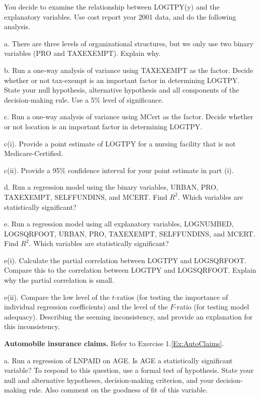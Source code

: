 \begin{exercises}
You decide to examine the relationship between LOGTPY(y) and the
explanatory variables. Use cost report year 2001 data, and do the
following analysis.

a. There are three levels of organizational structures, but we only
use two binary variables (PRO and TAXEXEMPT). Explain why.

b. Run a one-way analysis of variance using TAXEXEMPT as the factor.
Decide whether or not tax-exempt is an important factor in
determining LOGTPY. State your null hypothesis, alternative
hypothesis and all components of the decision-making rule. Use a 5\%
level of significance.

c. Run a one-way analysis of variance using MCert as the factor.
Decide whether or not location is an important factor in determining
LOGTPY.

c(i). Provide a point estimate of LOGTPY for a nursing facility that
is not Medicare-Certified.

c(ii).  Provide a 95\% confidence interval for your point estimate
in part (i).

d. Run a regression model using the binary variables, URBAN, PRO,
TAXEXEMPT, SELFFUNDINS, and MCERT. Find $R^{2}$. Which variables are
statistically significant?

e. Run a regression model using all explanatory variables,
LOGNUMBED, LOGSQRFOOT, URBAN, PRO, TAXEXEMPT, SELFFUNDINS, and
MCERT. Find $R^{2}$. Which variables are statistically significant?

e(i). Calculate the partial correlation between LOGTPY and
LOGSQRFOOT. Compare this to the correlation between LOGTPY and
LOGSQRFOOT. Explain why the partial correlation is small.

e(ii). Compare the low level of the $t$-ratios (for testing the
importance of individual regression coefficients) and the level of
the $F$-ratio (for testing model adequacy). Describing the seeming
inconsistency, and provide an explanation for this inconsistency.


\item \textbf{Automobile insurance claims.}\label{Ex:AutoClaims4} Refer to Exercise
1.\ref{Ex:AutoClaims}.

a. Run a regression of LNPAID on AGE. Is AGE a statistically
significant variable? To respond to this question, use a formal test
of hypothesis. State your null and alternative hypotheses,
decision-making criterion, and your decision-making rule. Also
comment on the goodness of fit of this variable.


\end{exercises}
